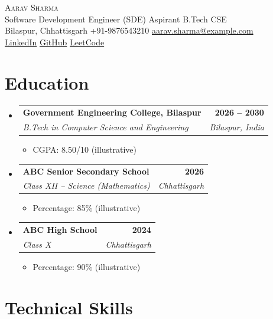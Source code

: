 \documentclass[letterpaper,10pt]{article}
\makeatletter
\newcommand{\resumeItem}[1]{
  \item\small{#1}
}
\newcommand{\resumeSubheading}[4]{
  \item
  \begin{tabular*}{0.97\textwidth}
    {l@{\extracolsep{\fill}}r}
    \textbf{\color{PrimaryColor}#1} &
    \textbf{\small #2} \\
    \textit{\small #3} &
    \textit{\small #4} \\
  \end{tabular*}\vspace{-4pt}
}
\newcommand{\resumeSubHeadingListStart}{
  \begin{itemize}[leftmargin=0.15in,label={}]
}
\newcommand{\resumeSubHeadingListEnd}{
  \end{itemize}
}
\newcommand{\resumeItemListStart}{
  \begin{itemize}[leftmargin=0.25in]
}
\newcommand{\resumeItemListEnd}{
  \end{itemize}\vspace{-4pt}
}
\makeatother
\begin{document}
\begin{center}
    {\Huge \scshape \color{PrimaryColor}
    Aarav Sharma}\\[3pt]

    \small Software Development Engineer (SDE) Aspirant
    \textbar{} B.Tech CSE\\[4pt]

    \small
    Bilaspur, Chhattisgarh
    \textbar{} +91-9876543210
    \textbar{}
    \href{mailto:aarav.sharma@example.com}
    {aarav.sharma@example.com}\\[3pt]

    \href{https://linkedin.com/in/your-profile}
    {LinkedIn}
    \textbar{}
    \href{https://github.com/your-username}
    {GitHub}
    \textbar{}
    \href{https://leetcode.com/your-profile/}
    {LeetCode}
\end{center}

\section{Education}

\resumeSubHeadingListStart

\resumeSubheading
  {Government Engineering College, Bilaspur}
  {2026 -- 2030}
  {B.Tech in Computer Science and Engineering}
  {Bilaspur, India}

\resumeItemListStart
  \resumeItem{CGPA: 8.50/10 (illustrative)}
\resumeItemListEnd

\resumeSubheading
  {ABC Senior Secondary School}
  {2026}
  {Class XII -- Science (Mathematics)}
  {Chhattisgarh}

\resumeItemListStart
  \resumeItem{Percentage: 85\% (illustrative)}
\resumeItemListEnd

\resumeSubheading
  {ABC High School}
  {2024}
  {Class X}
  {Chhattisgarh}

\resumeItemListStart
  \resumeItem{Percentage: 90\% (illustrative)}
\resumeItemListEnd

\resumeSubHeadingListEnd

\section{Technical Skills}
\end{document}
